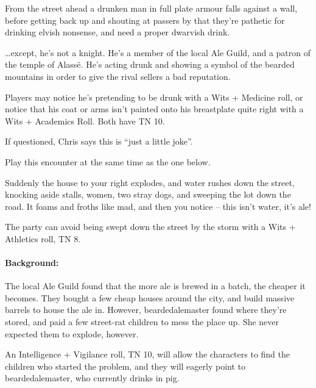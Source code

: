 \begin{multicols}{2}
\begin{boxtext}
	From the street ahead a drunken man in full plate armour falls against a wall, before getting back up and shouting at passers by that they're pathetic for drinking elvish nonsense, and need a proper dwarvish drink.

\end{boxtext}

\ldots except, he's not a knight.
He's a member of the local Ale Guild, and a patron of the temple of Alass\"{e}.
He's acting drunk and showing a symbol of the bearded mountains in order to give the rival sellers a bad reputation.

Players may notice he's pretending to be drunk with a Wits + Medicine roll, or notice that his coat or arms isn't painted onto his breastplate quite right with a Wits + Academics Roll.  Both have TN 10.



If questioned, Chris says this is ``just a little joke''.


Play this encounter at the same time as the one below.

\begin{boxtext}
	Suddenly the house to your right explodes, and water rushes down the street, knocking aside stalls, women, two stray dogs, and sweeping the lot down the road.  It foams and froths like mad, and then you notice -- this isn't water, it's ale!
\end{boxtext}

The party can avoid being swept down the street by the storm with a Wits + Athletics roll, TN 8.

\paragraph{Background:} The local Ale Guild found that the more ale is brewed in a batch, the cheaper it becomes.
They bought a few cheap houses around the city, and build massive barrels to house the ale in.
However, \gls{beardedalemaster} found where they're stored, and paid a few street-rat children to mess the place up.
She never expected them to explode, however.

An Intelligence + Vigilance roll, TN 10, will allow the characters to find the children who started the problem, and they will eagerly point to \gls{beardedalemaster}, who currently drinks in \gls{pig}.



\end{multicols}
